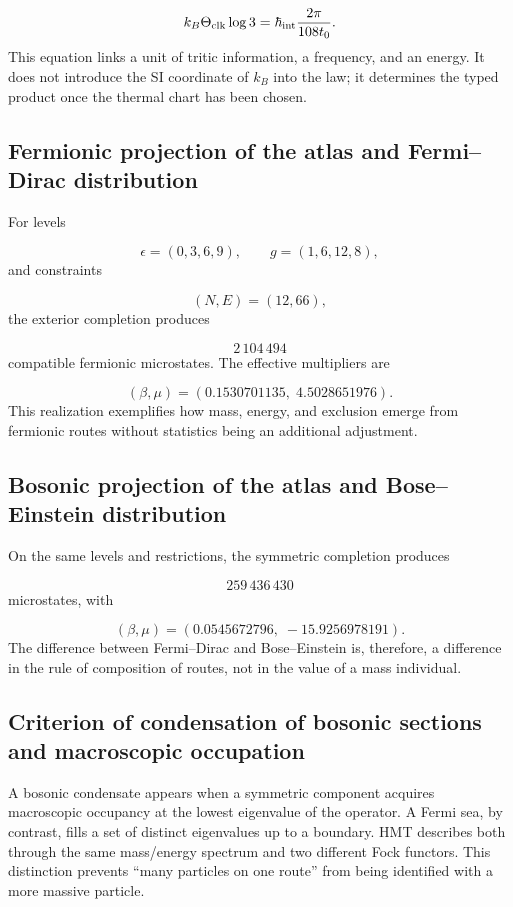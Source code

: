 \[
 k_B\Theta_{\rm clk}\log3
 =\hbar_{\rm int}\frac{2\pi}{108t_0}.
\]
This equation links a unit of tritic information, a frequency, and an energy. It does not introduce the SI coordinate of \(k_B\) into the law; it determines the typed product once the thermal chart has been chosen.

\subsection{Fermionic projection of the atlas and Fermi–Dirac distribution}
For levels

\[
 \epsilon=(0,3,6,9),\qquad
 g=(1,6,12,8),
\]
and constraints

\[
 (N,E)=(12,66),
\]
the exterior completion produces

\[
 2\,104\,494
\]
compatible fermionic microstates. The effective multipliers are

\[
 (\beta,\mu)
 =(0.1530701135,\;4.5028651976).
\]
This realization exemplifies how mass, energy, and exclusion emerge from fermionic routes without statistics being an additional adjustment.

\subsection{Bosonic projection of the atlas and Bose–Einstein distribution}
On the same levels and restrictions, the symmetric completion produces

\[
 259\,436\,430
\]
microstates, with

\[
 (\beta,\mu)
 =(0.0545672796,\;-15.9256978191).
\]
The difference between Fermi--Dirac and Bose--Einstein is, therefore, a difference in the rule of composition of routes, not in the value of a mass individual.

\subsection{Criterion of condensation of bosonic sections and macroscopic occupation}
A bosonic condensate appears when a symmetric component acquires macroscopic occupancy at the lowest eigenvalue of the operator. A Fermi sea, by contrast, fills a set of distinct eigenvalues up to a boundary. HMT describes both through the same mass/energy spectrum and two different Fock functors. This distinction prevents “many particles on one route” from being identified with a more massive particle.

